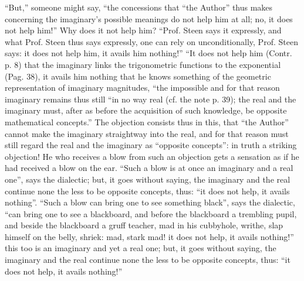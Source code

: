 \documentclass[12pt,a4paper,openany]{book}
\newcommand{\opage}[1]{\marginnote{\footnotesize\textit{[#1]}}}
\begin{document}
``But,'' someone might say, ``the concessions that ``the Author''
thus makes concerning the imaginary's possible meanings
\opage{24}\setcounter{footnote}{0}%
do not help him at all; no, it does not help him!''
Why does it not help him? ``Prof. Steen says it
expressly, and what Prof. Steen thus says expressly,
one can rely on unconditionally, Prof. Steen says: it does not help
him, it avails him nothing!'' ``It does not help him
(Contr. p. 8) that the imaginary links the trigonometric
functions to the exponential (Pag. 38), it avails him
nothing that he knows something of the geometric representation of imaginary magnitudes, ``the impossible and for that reason imaginary remains thus still ``in no way real (cf.
the note p. 39); the real and the imaginary must, after
as before the acquisition of such knowledge, be opposite
mathematical concepts.'' The objection consists thus in this,
that ``the Author'' cannot make the imaginary straightway into the
real, and for that reason must still regard the real and the
imaginary as ``opposite concepts'': in truth
a striking objection! He who receives a blow from such
an objection gets a sensation as if he had received a
blow on the ear. ``Such a blow is at once an
imaginary and a real one'', says the dialectic; but, it goes without saying, the imaginary and the real continue none the less to be
opposite concepts, thus: ``it does not help, it avails nothing''.
``Such a blow can bring one to see something black'', says
the dialectic, ``can bring one to see a blackboard, and before the
blackboard a trembling pupil, and beside the blackboard a
gruff teacher, mad in his cubbyhole, writhe, slap himself on the belly, shriek: mad, stark mad! it does not help, it avails nothing!''
this too is an imaginary and yet a real one; but, it goes without saying, the imaginary and the real continue none the less
to be opposite concepts, thus: ``it does not help, it
avails nothing!''
\end{document}
